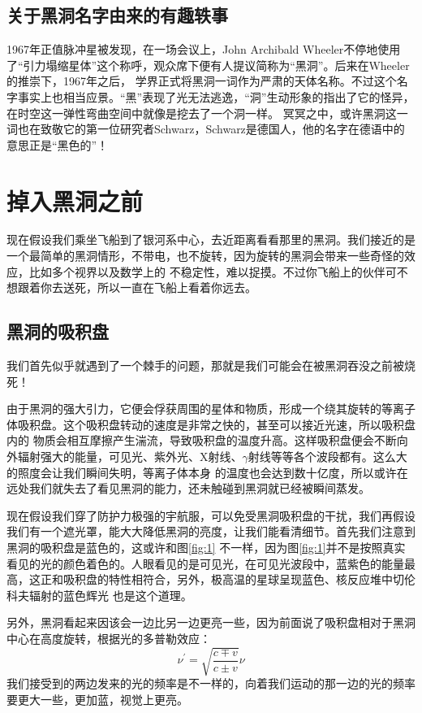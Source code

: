 \documentclass{ctexart}
\begin{document}
    \subsection{关于黑洞名字由来的有趣轶事}
    1967年正值脉冲星被发现，在一场会议上，John Archibald Wheeler不停地使用了“引力塌缩星体”这个称呼，观众席下便有人提议简称为“黑洞”。后来在Wheeler的推崇下，1967年之后，
    学界正式将黑洞一词作为严肃的天体名称。\cite{siegfried201950}不过这个名字事实上也相当应景。“黑”表现了光无法逃逸，“洞”生动形象的指出了它的怪异，在时空这一弹性弯曲空间中就像是挖去了一个洞一样。
    冥冥之中，或许黑洞这一词也在致敬它的第一位研究者Schwarz，Schwarz是德国人，他的名字在德语中的意思正是“黑色的”！

    \section{掉入黑洞之前}
    现在假设我们乘坐飞船到了银河系中心，去近距离看看那里的黑洞。我们接近的是一个最简单的黑洞情形，不带电，也不旋转，因为旋转的黑洞会带来一些奇怪的效应，比如多个视界以及数学上的
    不稳定性，难以捉摸。不过你飞船上的伙伴可不想跟着你去送死，所以一直在飞船上看着你远去。
    \subsection{黑洞的吸积盘}
    我们首先似乎就遇到了一个棘手的问题，那就是我们可能会在被黑洞吞没之前被烧死！

    由于黑洞的强大引力，它便会俘获周围的星体和物质，形成一个绕其旋转的等离子体吸积盘。\cite{page1974disk}这个吸积盘转动的速度是非常之快的，甚至可以接近光速，所以吸积盘内的
    物质会相互摩擦产生湍流，导致吸积盘的温度升高。这样吸积盘便会不断向外辐射强大的能量，可见光、紫外光、X射线、$\gamma$射线等等各个波段都有。\cite{bl}这么大的照度会让我们瞬间失明，等离子体本身
    的温度也会达到数十亿度，所以或许在远处我们就失去了看见黑洞的能力，还未触碰到黑洞就已经被瞬间蒸发。
    
    现在假设我们穿了防护力极强的宇航服，可以免受黑洞吸积盘的干扰，我们再假设我们有一个遮光罩，能大大降低黑洞的亮度，让我们能看清细节。首先我们注意到黑洞的吸积盘是蓝色的，这或许和图\ref{fig:1}
    不一样，因为图\ref{fig:1}并不是按照真实看见的光的颜色着色的。人眼看见的是可见光，在可见光波段中，蓝紫色的能量最高，这正和吸积盘的特性相符合，另外，极高温的星球呈现蓝色、核反应堆中切伦科夫辐射的蓝色辉光
    也是这个道理。

    另外，黑洞看起来因该会一边比另一边更亮一些，\cite{fukue1988color}因为前面说了吸积盘相对于黑洞中心在高度旋转，根据光的多普勒效应：
    \begin{equation}
        \nu^\prime=\sqrt{\frac{c\mp v}{c\pm v}}\nu
    \end{equation}
    我们接受到的两边发来的光的频率是不一样的，向着我们运动的那一边的光的频率要更大一些，更加蓝，视觉上更亮。
\end{document}
